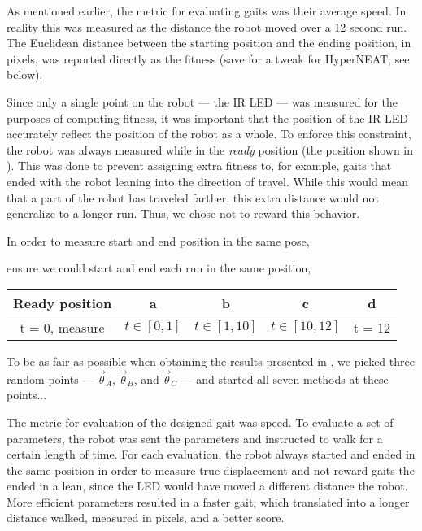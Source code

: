 As mentioned earlier, the metric for evaluating gaits was their
average speed.  In reality this was measured as the distance the robot
moved over a 12 second run.  The Euclidean distance between the
starting position and the ending position, in pixels, was reported
directly as the fitness (save for a tweak for HyperNEAT; see below).

Since only a single point on the robot --- the IR LED --- was measured
for the purposes of computing fitness, it was important that the
position of the IR LED accurately reflect the position of the robot as
a whole.  To enforce this constraint, the robot was always measured
while in the \emph{ready} position (the position shown in
).  This was done to prevent assigning extra
fitness to, for example, gaits that ended with the robot leaning into
the direction of travel.  While this would mean that a part of the
robot has traveled farther, this extra distance would not generalize
to a longer run.  Thus, we chose not to reward this behavior.


In order to measure start and end position in the same pose, 

ensure we could
start and end each run in the same position,


\begin{tabular}{ccccc}
Ready position & a & b & c & d\\
\hline
t = 0, measure  & $t \in [0,1]$ & $t \in [1,10]$ & $t \in [10,12]$ & t = 12
\end{tabular}





To be as fair as possible when obtaining the results presented in
, we picked three random points --- $\vec{\theta}_A$,
$\vec{\theta}_B$, and $\vec{\theta}_C$ --- and started all seven
methods at these points...



The metric for evaluation of the designed gait was speed. To evaluate
a set of parameters, the robot was sent the parameters and instructed
to walk for a certain length of time. For each evaluation, the robot
always started and ended in the same position in order to measure true
displacement and not reward gaits the ended in a lean, since the LED
would have moved a different distance the robot. More efficient
parameters resulted in a faster gait, which translated into a longer
distance walked, measured in pixels, and a better score.

